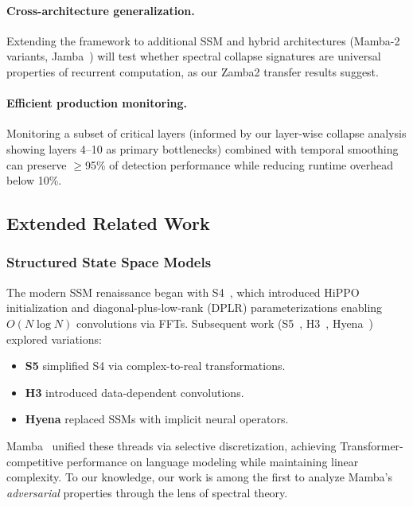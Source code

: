 \documentclass[10pt,twocolumn]{article}
\begin{document}
\paragraph{Cross-architecture generalization.}
Extending the framework to additional SSM and hybrid architectures (Mamba-2 variants, Jamba~\cite{lieber2024jamba}) will test whether spectral collapse signatures are universal properties of recurrent computation, as our Zamba2 transfer results suggest.

\paragraph{Efficient production monitoring.}
Monitoring a subset of critical layers (informed by our layer-wise collapse analysis showing layers 4--10 as primary bottlenecks) combined with temporal smoothing can preserve $\ge$95\% of detection performance while reducing runtime overhead below 10\%.

\subsection{Extended Related Work}
\label{sec:related}

\subsubsection{Structured State Space Models}

The modern SSM renaissance began with S4~\cite{gu2021efficiently}, which introduced HiPPO initialization and diagonal-plus-low-rank (DPLR) parameterizations enabling $O(N \log N)$ convolutions via FFTs. Subsequent work (S5~\cite{smith2023s5}, H3~\cite{dao2022hungry}, Hyena~\cite{poli2023hyena}) explored variations:
\begin{itemize}
\item \textbf{S5} simplified S4 via complex-to-real transformations.
\item \textbf{H3} introduced data-dependent convolutions.
\item \textbf{Hyena} replaced SSMs with implicit neural operators.
\end{itemize}

Mamba~\cite{gu2023mamba} unified these threads via selective discretization, achieving Transformer-competitive performance on language modeling while maintaining linear complexity. To our knowledge, our work is among the first to analyze Mamba's \emph{adversarial} properties through the lens of spectral theory.
\end{document}

